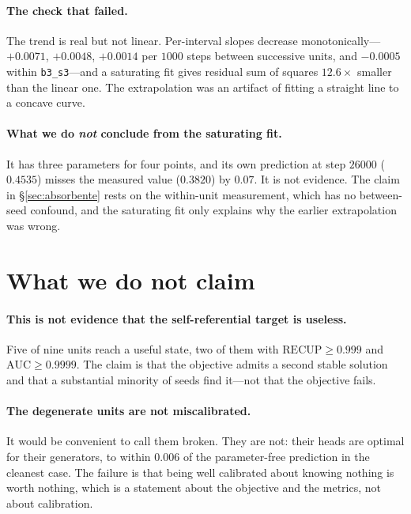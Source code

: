 \documentclass[11pt]{article}
\begin{document}
\paragraph{The check that failed.} The trend is real but not linear. Per-interval slopes decrease
monotonically---$+0.0071$, $+0.0048$, $+0.0014$ per $1000$ steps between successive units, and
$-0.0005$ within \texttt{b3\_s3}---and a saturating fit gives residual sum of squares $12.6\times$
smaller than the linear one. The extrapolation was an artifact of fitting a straight line to a
concave curve.

\paragraph{What we do \emph{not} conclude from the saturating fit.} It has three parameters for four
points, and its own prediction at step $26000$ ($0.4535$) misses the measured value ($0.3820$) by
$0.07$. It is not evidence. The claim in \S\ref{sec:absorbente} rests on the within-unit measurement,
which has no between-seed confound, and the saturating fit only explains why the earlier
extrapolation was wrong.

\section{What we do not claim}
\label{sec:noclaim}

\paragraph{This is not evidence that the self-referential target is useless.} Five of nine units
reach a useful state, two of them with $\mathrm{RECUP} \geq 0.999$ and $\mathrm{AUC} \geq 0.9999$.
The claim is that the objective admits a second stable solution and that a substantial minority of
seeds find it---not that the objective fails.

\paragraph{The degenerate units are not miscalibrated.} It would be convenient to call them broken.
They are not: their heads are optimal for their generators, to within $0.006$ of the parameter-free
prediction in the cleanest case. The failure is that being well calibrated about knowing nothing is
worth nothing, which is a statement about the objective and the metrics, not about calibration.
\end{document}
